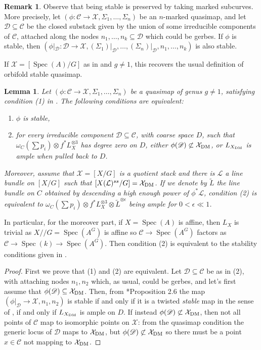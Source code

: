 \documentclass{amsart}
\newcommand{\sC}{\mathscr{C}}
\newcommand{\sD}{\mathscr{D}}
\newcommand{\cL}{\mathcal{L}}
\newcommand{\cX}{\mathcal{X}}
\newcommand{\spec}{\operatorname{Spec}}
\newcommand{\dm}{{\rm DM}}
\newtheorem{Lemma}[theorem]{Lemma}
\theoremstyle{definition}
\newtheorem{Remark}[theorem]{Remark}
\theoremstyle{definition}
\begin{document}
{\begin{Remark}\label{remark_passing_to_a_subcurve_preserves_stability} Observe that being stable is preserved by taking marked subcurves. More precisely, let $(\phi:\sC\to \cX, \Sigma_1,\ldots, \Sigma_n) $ be an $n$-marked quasimap, and let $\sD\subseteq \sC$ be the closed substack given by the union of some irreducible components of $\sC$, attached along the nodes $n_1,\ldots, n_k\subseteq \sD$ which could be gerbes. If $\phi$ is stable, then $(\phi|_\sD:\sD\to \cX, (\Sigma_1)|_\sD,\ldots, (\Sigma_n)|_\sD, n_1,\ldots,n_k)$ is also stable.
\end{Remark}
If $\cX=[\spec(A)/G]$ as in \cites{ciocan2014stable, orbifold_qmap_theory} and $g\neq 1$, this recovers the usual definition of orbifold stable quasimap.
\begin{Lemma}\label{lemma_equivalent_conditions_for_stability}
    Let $(\phi:\sC\to \cX, \Sigma_1,\ldots, \Sigma_n) $ be a quasimap of genus $g\neq 1$, satisfying condition (1) in . The following conditions are equivalent:
    \begin{enumerate}
        \item $\phi$ is stable,
        \item for every irreducible component $\sD\subseteq \sC$, with coarse space $D$, such that $\omega_C(\sum p_i)\otimes f^*L_X^{\otimes 3}$ has degree zero on $D$, either $\phi(\sD)\not \subset \cX_{\dm}$, or $L_{X_\dm}$ is ample when pulled back to $D$.    \end{enumerate} 
        Moreover, assume that $\cX=[X/G]$ is a quotient stack and there is $\cL$ a line bundle on $[X/G]$ such that $[X(\cL)^{ss}/G]=\cX_\dm$. If we denote by $\widetilde{L}$ the line bundle on $C$ obtained by descending a high enough power of $\phi^*\cL$, condition (2) is equivalent to $\omega_C(\sum p_i)\otimes f^*L_X^{\otimes 3}\otimes \widetilde{L}^{\otimes \epsilon}$ being ample for $0<\epsilon \ll 1$.
\end{Lemma}
In particular, for the moreover part, if $X=\spec(A)$ is affine, then $L_X$ is trivial as $X/\!\!/G=\spec(A^G)$ is affine so $\sC\to\spec(A^G)$ factors as $\sC\to \spec(k)\to \spec(A^G)$. Then condition (2) is equivalent to the stability conditions given in \cites{ciocan2014stable,orbifold_qmap_theory}.
\begin{proof}
First we prove that (1) and (2) are equivalent. Let $\sD\subseteq \sC$ be as in (2), with attaching nodes $n_1,n_2$ which, as usual, could be gerbes, and let's first assume that $\phi(\sD)\subseteq \cX_\dm$. Then, from \cite{dli1}*{Proposition 2.6} the map $(\phi|_\sD\to \cX, n_1,n_2)$ is stable if and only if it is a twisted \textit{stable} map in the sense of \cite{AV_compactifying}, if and only if $L_{X_\dm}$ is ample on $D$. 
If instead $\phi(\sD)\not \subset \cX_\dm$, then not all points of $\sC$ map to isomorphic points on $\cX$: from the quasimap condition the generic locus of $\sD$ maps to $\cX_\dm$, but $\phi(\sD)\not \subset \cX_\dm$ so there must be a point $x\in \sC$ not mapping to $\cX_\dm$.


\end{proof}}
\end{document}
